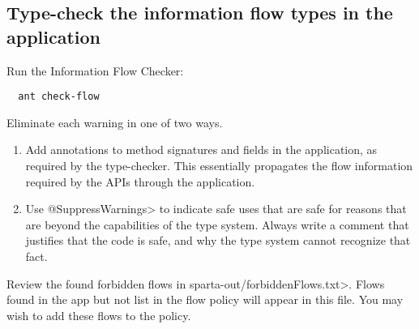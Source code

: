 %

\subsection{Type-check the information flow types in the application\label{sec:run-type-checker}}

Run the Information Flow Checker:

\begin{Verbatim}
  ant check-flow
\end{Verbatim}

Eliminate each warning in one of two ways.
\begin{enumerate}
\item Add annotations to method signatures and fields in the application, as
required by the type-checker. This essentially propagates the flow
information required by the APIs through the application.

\item Use \<@SuppressWarnings> to indicate safe uses that are safe for reasons
that are beyond the capabilities of the type system. Always write a
comment that justifies that the code is safe, and why the type system
cannot recognize that fact.

\end{enumerate}

Review the found forbidden flows in \<sparta-out/forbiddenFlows.txt>.  
Flows found in the app but not list in the flow policy will appear in this file.  
You may wish to add these flows to the policy.

